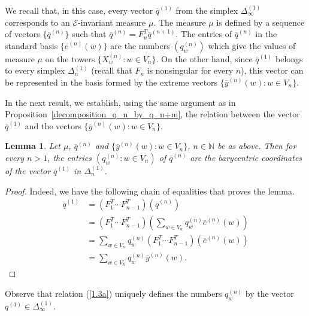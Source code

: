 \documentclass[11pt, english, reqno]{amsart}
\theoremstyle{definition}
\theoremstyle{remark}
\theoremstyle{plain}
\newtheorem{lemma}[defin]{Lemma}
\def\ov{\overline}
\numberwithin{equation}{section}
\begin{document}
We recall that, in this case,  every vector $\ov q^{(1)}$  from the simplex
$\Delta_{\infty}^{(1)}$ corresponds to an
 $\mathcal E$-invariant measure $\mu$. The measure $\mu$
 is defined by a sequence of vectors $\{\ov q^{(n)}\}$ such that
 $\ov q^{(n)}  = F_n^T \ov q^{(n+1)}$.  The  entries of $\ov q^{(n)}$ in
  the standard basis  $\{\ov e^{(n)}(w)\}$ are the numbers
  $(q_w^{(n)})$   which give
the values of measure $\mu$ on the towers  $\{X^{(n)}_w : w \in V_n\}$.
 On the other hand, since $\ov q^{(1)}$ belongs to every simplex
 $\Delta^{(1)}_n$ (recall that $F_n$ is nonsingular for every $n$),
this vector can be represented in the basis formed by the extreme vectors
  $\{\ov y^{(n)}(w) : w \in V_n\}$.

In the next result,  we establish,  using the same argument as in
Proposition~\ref{decomposition_q_n_by_q_n+m}, the relation between the
vector $\ov q^{(1)}$ and the vectors $\{\ov y^{(n)}(w) : w \in V_n\}$.

\begin{lemma}\label{lem barycentric coordinates}
Let $\mu$, $\ov q^{(n)}$ and $\{\ov y^{(n)}(w) : w \in V_n\}$, $n \in
\mathbb{N}$ be as above. Then
for every $n >1$, the entries  $(q_w^{(n)} : w \in V_n)$ of
$\ov q^{(n)}$ are the barycentric coordinates of the vector
$\ov q^{(1)}$ in $\Delta_n^{(1)}$.
\end{lemma}

\begin{proof}
Indeed, we have the following chain of equalities that proves the lemma.
\begin{align}\label{1.3a}
\ov q^{(1)} &=(F_1^T \cdots F_{n-1}^T)
(\ov q^{(n)})\nonumber \\
 &= (F_1^T \cdots F_{n-1}^T)
\left(\sum_{w \in V_n}q_w^{(n)}\ov e^{(n)}(w)\right)\nonumber\\
 &= \sum_{w \in V_n}q_w^{(n)} (F_1^T \cdots
 F_{n-1}^T)(\ov e^{(n)}(w))\\
 \nonumber
 &= \sum_{w \in V_n}q_w^{(n)} \ov y^{(n)}(w).
\end{align}
\end{proof}

Observe that relation (\ref{1.3a}) uniquely defines
 the numbers $q^{(n)}_w$ by the vector $q^{(1)} \in
 \Delta_{\infty}^{(1)}$.
\end{document}
